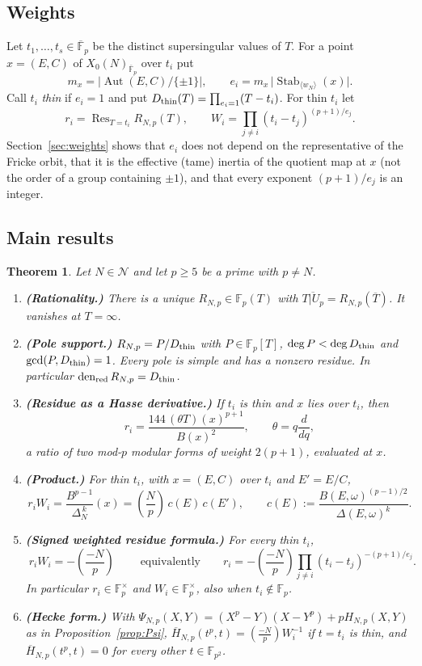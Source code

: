 \documentclass[11pt,a4paper]{article}
\numberwithin{equation}{section}
\newtheorem{maintheorem}[theorem]{Theorem}
\theoremstyle{definition}
\theoremstyle{remark}
\newcommand{\Fp}{\mathbb F_p}
\newcommand{\Fq}{\mathbb F_{p^2}}
\newcommand{\Fb}{\overline{\mathbb F}_p}
\newcommand{\Res}{\operatorname{Res}}
\newcommand{\Aut}{\operatorname{Aut}}
\newcommand{\Stab}{\operatorname{Stab}}
\newcommand{\den}{\operatorname{den}_{\mathrm{red}}}
\newcommand{\Lp}[1]{\left(\frac{#1}{p}\right)}
\begin{document}
\subsection{Weights}
Let $t_1,\dots,t_s\in\Fb$ be the distinct supersingular values of $T$. For a point
$x=(E,C)$ of $X_0(N)_{\Fb}$ over $t_i$ put
\[
m_x=\bigl|\Aut(E,C)/\{\pm1\}\bigr|,\qquad e_i=m_x\,\bigl|\Stab_{\langle w_N\rangle}(x)\bigr|.
\]
Call $t_i$ \emph{thin} if $e_i=1$ and put $D_{\rm thin}(T)=\prod_{e_i=1}(T-t_i)$. For thin $t_i$ let
\[
r_i=\Res_{T=t_i}R_{N,p}(T),\qquad W_i=\prod_{j\ne i}(t_i-t_j)^{(p+1)/e_j}.
\]
Section~\ref{sec:weights} shows that $e_i$ does not depend on the representative of the Fricke
orbit, that it is the effective (tame) inertia of the quotient map at $x$ (not the order of a group
containing $\pm1$), and that every exponent $(p+1)/e_j$ is an integer.

\subsection{Main results}
\begin{maintheorem}\label{thm:main}
Let $N\in\mathcal N$ and let $p\ge5$ be a prime with $p\ne N$.
\begin{enumerate}[label=\textup{(\alph*)}]
\item \textbf{(Rationality.)} There is a unique $R_{N,p}\in\Fp(T)$ with $\overline{T|U_p}=R_{N,p}(\overline T)$. It vanishes at $T=\infty$.
\item \textbf{(Pole support.)} $R_{N,p}=P/D_{\rm thin}$ with $P\in\Fp[T]$,
$\deg P<\deg D_{\rm thin}$ and $\gcd(P,D_{\rm thin})=1$. Every pole is simple and has a nonzero residue. In particular $\den R_{N,p}=D_{\rm thin}$.
\item \textbf{(Residue as a Hasse derivative.)} If $t_i$ is thin and $x$ lies over $t_i$, then
\[
r_i=\frac{144\,(\theta T)(x)^{p+1}}{B(x)^2},\qquad \theta=q\frac{d}{dq},
\]
a ratio of two mod-$p$ modular forms of weight $2(p+1)$, evaluated at $x$.
\item \textbf{(Product.)} For thin $t_i$, with $x=(E,C)$ over $t_i$ and $E'=E/C$,
\[
r_iW_i=\frac{B^{p-1}}{\Delta_N^{\,k}}(x)=\Lp{N}\,c(E)\,c(E'),\qquad
c(E):=\frac{B(E,\omega)^{(p-1)/2}}{\Delta(E,\omega)^{k}}.
\]
\item \textbf{(Signed weighted residue formula.)} For every thin $t_i$,
\[
\boxed{\;r_iW_i=-\Lp{-N}\;}\qquad\text{equivalently}\qquad
r_i=-\Lp{-N}\prod_{j\ne i}(t_i-t_j)^{-(p+1)/e_j}.
\]
In particular $r_i\in\Fp^\times$ and $W_i\in\Fp^\times$, also when $t_i\notin\Fp$.
\item \textbf{(Hecke form.)} With $\Psi_{N,p}(X,Y)=(X^p-Y)(X-Y^p)+pH_{N,p}(X,Y)$ as in
Proposition~\ref{prop:Psi}, $\overline H_{N,p}(t^p,t)=\Lp{-N}W_i^{-1}$ if $t=t_i$ is thin, and
$\overline H_{N,p}(t^p,t)=0$ for every other $t\in\Fq$.
\end{enumerate}
\end{maintheorem}
\end{document}
